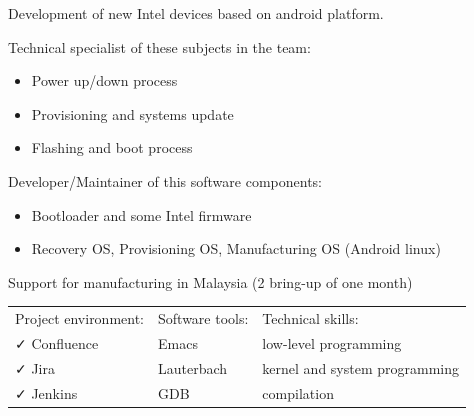 \documentclass[letterpaper]{jm-cv} %
\begin{document}
\small{

Development of new Intel devices based on android platform.

{\footnotesize\color{maingray}\bullet} Technical specialist of these subjects in the team:
\vspace{-0.2cm}
\begin{itemize}
\item[\color{mainblue}\faArrowRight] Power up/down process
\item[\color{mainblue}\faArrowRight] Provisioning and systems update
\item[\color{mainblue}\faArrowRight] Flashing and boot process
\end{itemize}

{\footnotesize\color{maingray}\bullet}  Developer/Maintainer of this software components:
\vspace{-0.2cm}
\begin{itemize}
\item[\color{mainblue}\faArrowRight] Bootloader and some Intel firmware
\item[\color{mainblue}\faArrowRight] Recovery OS, Provisioning OS, Manufacturing OS (Android linux)
\end{itemize}

{\footnotesize\color{maingray}\bullet} Support for manufacturing in Malaysia (2 bring-up of one month)\\

\begin{tabular}{ l l l }
  Project environment: & \hspace{1cm}Software tools: & \hspace{1cm}Technical skills:\\
  {\color{mainblue}\faCheck} Confluence &
  \hspace{1cm}{\color{maingreen}\faCheck} Emacs &
  \hspace{1cm}{\color{maingray}\faCheck} low-level programming\\

  {\color{mainblue}\faCheck} Jira &
  \hspace{1cm}{\color{maingreen}\faCheck} Lauterbach &
  \hspace{1cm}{\color{maingray}\faCheck} kernel and system programming\\

  {\color{mainblue}\faCheck} Jenkins &
  \hspace{1cm}{\color{maingreen}\faCheck} GDB &
  \hspace{1cm}{\color{maingray}\faCheck} compilation\\


\end{tabular}}
\end{document}
